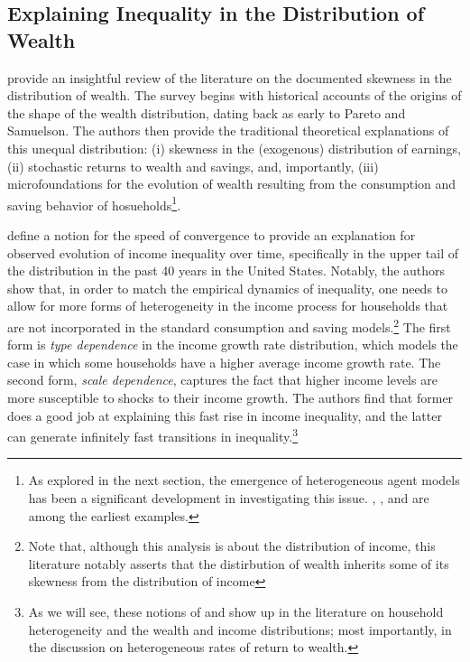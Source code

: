 \subsection{Explaining Inequality in the Distribution of Wealth}

\par \cite{jbab18} provide an insightful review of the literature on the documented skewness in the distribution of wealth. The survey begins with historical accounts of the origins of the shape of the wealth distribution, dating back as early to Pareto and Samuelson. The authors then provide the traditional theoretical explanations of this unequal distribution: (i) skewness in the (exogenous) distribution of earnings, (ii) stochastic returns to wealth and savings, and, importantly, (iii) microfoundations for the evolution of wealth resulting from the consumption and saving behavior of hosueholds\footnote{As explored in the next section, the emergence of heterogeneous agent models has been a significant development in investigating this issue. \cite{tb1983}, \cite{ra1994}, and \cite{mh1993} are among the earliest examples.}.

\par \cite{Gabaix2016} define a notion for the speed of convergence to provide an explanation for observed evolution of income inequality over time, specifically in the upper tail of the distribution in the past 40 years in the United States. Notably, the authors show that, in order to match the empirical dynamics of inequality, one needs to allow for more forms of heterogeneity in the income process for households that are not incorporated in the standard consumption and saving models.\footnote{Note that, although this analysis is about the distribution of income, this literature notably asserts that the distirbution of wealth inherits some of its skewness from the distribution of income} The first form is \textit{type dependence} in the income growth rate distribution, which models the case in which some households have a higher average income growth rate. The second form, \textit{scale dependence}, captures the fact that higher income levels are more susceptible to shocks to their income growth. The authors find that former does a good job at explaining this fast rise in income inequality, and the latter can generate infinitely fast transitions in inequality.\footnote{As we will see, these notions of  and  show up in the literature on household heterogeneity and the wealth and income distributions; most importantly, in the discussion on heterogeneous rates of return to wealth.} 

